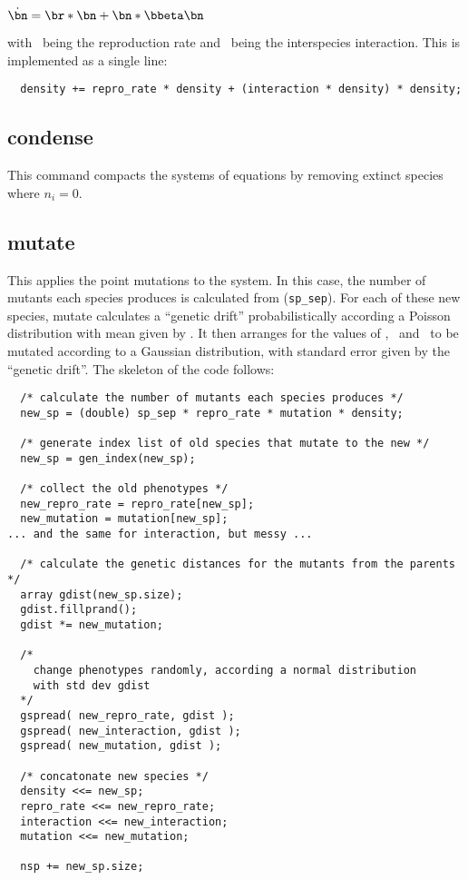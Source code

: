 \begin{math}
\dot{\bn} = \br*\bn + \bn*\bbeta\bn
\end{math}

with \br\ being the reproduction rate and \bbeta\ being the
interspecies interaction. This is implemented as a single line:

\begin{verbatim}
  density += repro_rate * density + (interaction * density) * density;
\end{verbatim}

\subsection{condense}\label{condense}

This command compacts the systems of equations by removing extinct
species where $n_i=0$.

\subsection{mutate}\label{mutate}

This applies the point mutations to the system. In this case, the
number of mutants each species produces is calculated from
(\verb|sp_sep|)\br\bmu\bn. For each of these new species, mutate
calculates a ``genetic drift'' probabilistically according a Poisson
distribution with mean given by \bmu. It then arranges for the values
of \br, \bbeta\ and \bmu\ to be mutated according to a Gaussian
distribution, with standard error given by the ``genetic drift''. The
skeleton of the code follows:

\begin{verbatim}
  /* calculate the number of mutants each species produces */
  new_sp = (double) sp_sep * repro_rate * mutation * density;

  /* generate index list of old species that mutate to the new */
  new_sp = gen_index(new_sp); 

  /* collect the old phenotypes */
  new_repro_rate = repro_rate[new_sp];
  new_mutation = mutation[new_sp];
... and the same for interaction, but messy ...

  /* calculate the genetic distances for the mutants from the parents */
  array gdist(new_sp.size);
  gdist.fillprand();
  gdist *= new_mutation;

  /* 
    change phenotypes randomly, according a normal distribution 
    with std dev gdist 
  */
  gspread( new_repro_rate, gdist );
  gspread( new_interaction, gdist );
  gspread( new_mutation, gdist );

  /* concatonate new species */
  density <<= new_sp;
  repro_rate <<= new_repro_rate;
  interaction <<= new_interaction;
  mutation <<= new_mutation;

  nsp += new_sp.size;
\end{verbatim}

